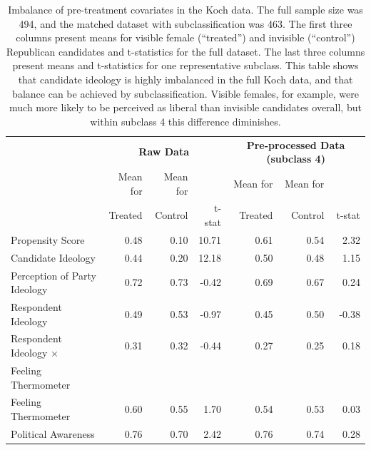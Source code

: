 \documentclass[11pt,titlepage]{article}
\newcommand{\MC}{\multicolumn}
\begin{document}
\begin{table}[t]
  \begin{center}
    \begin{tabular}{lrrrrrr}
      \hline
      & \MC{3}{c}{\bf Raw Data} & \MC{3}{c}{\bf Pre-processed Data
      (subclass 4) }\\
      & Mean for  & Mean for  &    & Mean for  & Mean for \\
      & Treated & Control  & t-stat &    Treated & Control  & t-stat \\
      \hline
      Propensity Score & 0.48 & 0.10 & 10.71 & 0.61 & 0.54 & 2.32 \\
      Candidate Ideology & 0.44 & 0.20 & 12.18 & 0.50 & 0.48 & 1.15 \\
      Perception of Party Ideology & 0.72 & 0.73 & -0.42 & 0.69 & 0.67 & 0.24 \\
      Respondent Ideology & 0.49 & 0.53 & -0.97 & 0.45 & 0.50 & -0.38 \\
      \hspace{0.1in} Respondent Ideology $\times$ & 0.31 & 0.32 & -0.44 & 0.27 &
      0.25 & 0.18 \\
      Feeling Thermometer\\
      Feeling Thermometer & 0.60 & 0.55 & 1.70 & 0.54 & 0.53 & 0.03 \\
      Political Awareness & 0.76 & 0.70 & 2.42 & 0.76 & 0.74 & 0.28 \\
      \hline
    \end{tabular}
    \caption{Imbalance of pre-treatment covariates in the Koch data.
      The full sample size was 494, and the matched dataset with
      subclassification was 463.  The first three columns present
      means for visible female (``treated'') and invisible (``control'')
      Republican candidates and t-statistics for the full
      dataset.  The last three columns present means and t-statistics
      for one representative subclass.  This table shows that
      candidate ideology is highly imbalanced in the full Koch data,
      and that balance can be achieved by subclassification.  Visible
      females, for example, were much more likely to be perceived as
      liberal than invisible candidates overall, but within subclass 4
      this difference diminishes.}
    \label{tb:kochmtest}
  \end{center}
\end{table}
\end{document}
